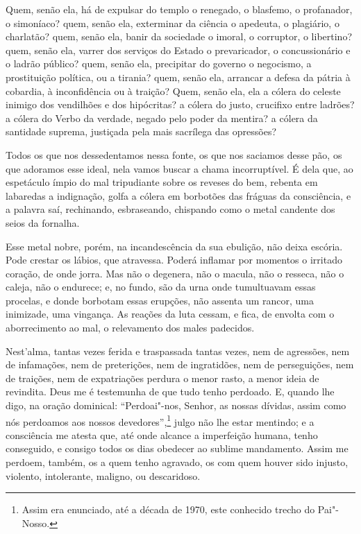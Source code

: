 Quem, senão ela, há de expulsar do templo o renegado, o blasfemo,
o profanador, o simoníaco? quem, senão ela, exterminar da ciência o
apedeuta, o plagiário, o charlatão? quem, senão ela, banir da sociedade
o imoral, o corruptor, o libertino? quem, senão ela, varrer dos
serviços do Estado o prevaricador, o concussionário e o ladrão público?
quem, senão ela, precipitar do governo o negocismo, a prostituição
política, ou a tirania? quem, senão ela, arrancar a defesa da pátria à
cobardia, à inconfidência ou à traição? Quem, senão ela, ela a cólera
do celeste inimigo dos vendilhões e dos hipócritas? a cólera do justo,
crucifixo entre ladrões? a cólera do Verbo da verdade, negado pelo
poder da mentira? a cólera da santidade suprema, justiçada pela mais
sacrílega das opressões?

Todos os que nos dessedentamos nessa fonte, os que nos saciamos
desse pão, os que adoramos esse ideal, nela vamos buscar a chama
incorruptível. É dela que, ao espetáculo ímpio do mal tripudiante sobre
os reveses do bem, rebenta em labaredas a indignação, golfa a cólera em
borbotões das fráguas da consciência, e a palavra saí, rechinando,
esbraseando, chispando como o metal candente dos seios da fornalha.

Esse metal nobre, porém, na incandescência da sua ebulição, não
deixa escória. Pode crestar os lábios, que atravessa. Poderá inflamar
por momentos o irritado coração, de onde jorra. Mas não o degenera, não
o macula, não o resseca, não o caleja, não o endurece; e, no fundo, são
da urna onde tumultuavam essas procelas, e donde borbotam essas
erupções, não assenta um rancor, uma inimizade, uma vingança. As
reações da luta cessam, e fica, de envolta com o aborrecimento ao mal,
o relevamento dos males padecidos.

Nest'alma, tantas vezes ferida e traspassada
tantas vezes, nem de agressões, nem de infamações, nem de preterições,
nem de ingratidões, nem de perseguições, nem de traições, nem de
expatriações perdura o menor rasto, a menor ideia de revindita. Deus me
é testemunha de que tudo tenho perdoado. E, quando lhe digo, na oração
dominical: ``Perdoai"-nos, Senhor, as nossas dívidas, assim
como nós perdoamos aos nossos devedores'',\footnote{Assim era enunciado, até a década de 1970, este conhecido trecho do Pai"-Nosso.}
julgo não lhe estar mentindo; e a consciência me atesta que, até onde
alcance a imperfeição humana, tenho conseguido, e consigo todos os dias obedecer ao
sublime mandamento. Assim me perdoem, também, os a quem tenho agravado,
os com quem houver sido injusto, violento, intolerante, maligno, ou
descaridoso.

